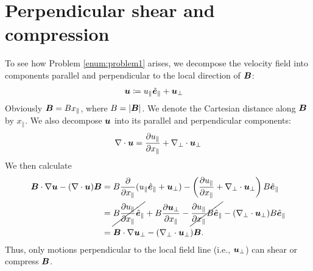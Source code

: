 \documentclass[12pt]{article}
\newcommand{\xpar}{x_\parallel}
\newcommand{\epar}{\e_\parallel}
\newcommand{\upar}{u_\parallel}
\newcommand{\uperp}{\vecu_\perp}
\begin{document}
\section{Perpendicular shear and compression}
To see how Problem \ref{enum:problem1} arises, we decompose the velocity field into components parallel and perpendicular to the local direction of $\bm{B}$:
\begin{align}
	\vecu &\define \upar\epar + \uperp
\end{align} 
Obviously $\vecb=B\xpar$, where $B=|\bm{B}|$. We denote the Cartesian distance along $\bm{B}$ by $\xpar$. We also decompose $\bm{u}$ into its parallel and perpendicular components:
\begin{align}
	\Div\vecu=\pderiv{\upar}{\xpar}+\nabla_\perp\cdot\uperp
\end{align}
We then calculate
\begin{align}
	\vecb\dotgrad\vecu - (\Div\vecu)\vecb&=B\pderiv{}{\xpar}(\upar\epar + \uperp) -\left(\pderiv{\upar}{\xpar}+\nabla_\perp\cdot\uperp\right)B\epar\nonumber\\
	&= \cancel{B\pderiv{\upar}{\xpar}\epar} + B\pderiv{\uperp}{\xpar} -\cancel{\pderiv{\upar}{\xpar} B\epar} - (\nabla_\perp\cdot\uperp)B\epar\nonumber\\
	&= \vecb\dotgrad\uperp - (\nabla_\perp\cdot\uperp)\vecb.
\end{align}
Thus, only motions perpendicular to the local field line (i.e., $\uperp$) can shear or compress $\bm{B}$.  
\end{document}
